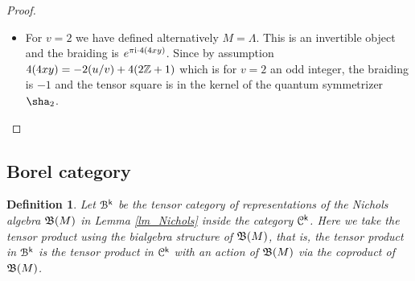 \documentclass[a4paper, reqno]{amsart}
\newtheorem{definition}[theorem]{Definition}
\theoremstyle{introTheorems}
\newcommand\cB{\mathcal{B}}
\newcommand\cC{\mathcal{C}}
\renewcommand{\1}{\mathbbold{1}}
\begin{document}
\begin{proof}
\begin{itemize}
\item 
For $v=2$ we have defined alternatively $M=\Lambda$. This is an invertible object and the braiding is $e^{\pi\mathrm{i}\cdot 4(4xy)}$. Since by assumption $4(4xy)=-2(u/v)+4(2\mathbb{Z}+1)$ which is for $v=2$ an odd integer, the braiding is $-1$ and the tensor square is in the kernel of the quantum symmetrizer $\sha_2$. 
\end{itemize}
\end{proof}


\subsection{Borel category}\label{subsec:QuantumBorel}

\begin{definition}
Let $\cB^\k$ be the tensor category of representations of the Nichols algebra $\mathfrak{B}(M)$ in Lemma \ref{lm_Nichols} inside the category $\cC^\k$. Here we take the tensor product using the bialgebra structure of $\mathfrak{B}(M)$, that is, the tensor product in $\cB^\k$ is the tensor product in $\cC^\k$ with an action of $\mathfrak{B}(M)$ via the coproduct of $\mathfrak{B}(M)$.    
\end{definition}
\end{document}

